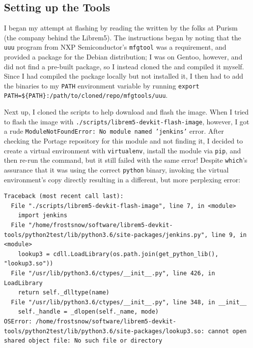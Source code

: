 \documentclass{article}
\begin{document}
\subsection{Setting up the Tools}
I began my attempt at flashing by reading the  written by the folks at Purism (the company behind the Librem5).  The instructions began by noting that the \texttt{uuu} program from NXP Semiconductor's \texttt{mfgtool} was a requirement, and provided a package for the Debian distribution; I was on Gentoo, however, and did not find a pre-built package, so I instead cloned the  and compiled it myself.  Since I had compiled the package locally but not installed it, I then had to add the binaries to my \texttt{PATH} environment variable by running \verb|export PATH=${PATH}:/path/to/cloned/repo/mfgtools/uuu|.

Next up, I cloned the  scripts to help download and flash the image.  When I tried to flash the image with \texttt{./scripts/librem5-devkit-flash-image}, however, I got a rude \texttt{ModuleNotFoundError: No module named 'jenkins'} error.  After checking the Portage repository for this module and not finding it, I decided to create a virtual environment with \texttt{virtualenv}, install the module via \texttt{pip}, and then re-run the command, but it still failed with the same error!  Despite \texttt{which}'s assurance that it was using the correct \texttt{python} binary, invoking the virtual environment's copy directly resulting in a different, but more perplexing error:

\begin{verbatim}
Traceback (most recent call last):
  File "./scripts/librem5-devkit-flash-image", line 7, in <module>
    import jenkins
  File "/home/frostsnow/software/librem5-devkit-tools/python2test/lib/python3.6/site-packages/jenkins.py", line 9, in <module>
    lookup3 = cdll.LoadLibrary(os.path.join(get_python_lib(), "lookup3.so"))
  File "/usr/lib/python3.6/ctypes/__init__.py", line 426, in LoadLibrary
    return self._dlltype(name)
  File "/usr/lib/python3.6/ctypes/__init__.py", line 348, in __init__
    self._handle = _dlopen(self._name, mode)
OSError: /home/frostsnow/software/librem5-devkit-tools/python2test/lib/python3.6/site-packages/lookup3.so: cannot open shared object file: No such file or directory
\end{verbatim}
\end{document}
